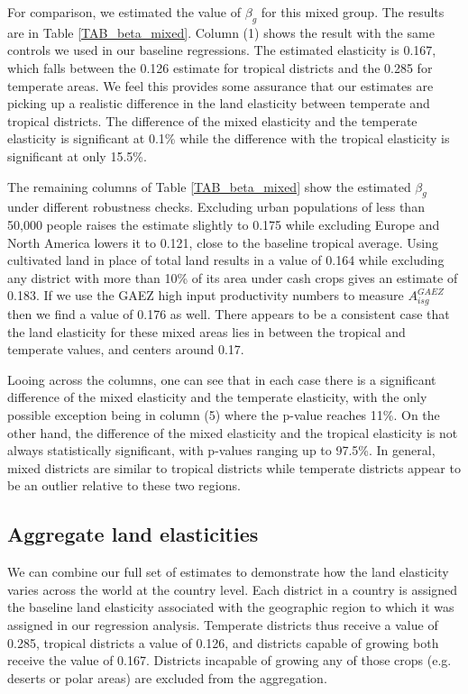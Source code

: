 \documentclass[12pt]{article}
\begin{document}
For comparison, we estimated the value of $\beta_g$ for this mixed group. The results are in Table \ref{TAB_beta_mixed}. Column (1) shows the result with the same controls we used in our baseline regressions. The estimated elasticity is 0.167, which falls between the 0.126 estimate for tropical districts and the 0.285 for temperate areas. We feel this provides some assurance that our estimates are picking up a realistic difference in the land elasticity between temperate and tropical districts. The difference of the mixed elasticity and the temperate elasticity is significant at 0.1\% while the difference with the tropical elasticity is significant at only 15.5\%.

The remaining columns of Table \ref{TAB_beta_mixed} show the estimated $\beta_g$ under different robustness checks. Excluding urban populations of less than 50,000 people raises the estimate slightly to 0.175 while excluding Europe and North America lowers it to 0.121, close to the baseline tropical average. Using cultivated land in place of total land results in a value of 0.164 while excluding any district with more than 10\% of its area under cash crops gives an estimate of 0.183. If we use the GAEZ high input productivity numbers to measure $A^{GAEZ}_{isg}$ then we find a value of 0.176 as well. There appears to be a consistent case that the land elasticity for these mixed areas lies in between the tropical and temperate values, and centers around 0.17. 

Looing across the columns, one can see that in each case there is a significant difference of the mixed elasticity and the temperate elasticity, with the only possible exception being in column (5) where the p-value reaches 11\%. On the other hand, the difference of the mixed elasticity and the tropical elasticity is not always statistically significant, with p-values ranging up to 97.5\%. In general, mixed districts are similar to tropical districts while temperate districts appear to be an outlier relative to these two regions.

\subsection{Aggregate land elasticities}
We can combine our full set of estimates to demonstrate how the land elasticity varies across the world at the country level. Each district in a country is assigned the baseline land elasticity associated with the geographic region to which it was assigned in our regression analysis. Temperate districts thus receive a value of 0.285, tropical districts a value of 0.126, and districts capable of growing both receive the value of 0.167. Districts incapable of growing any of those crops (e.g. deserts or polar areas) are excluded from the aggregation. 
\end{document}
